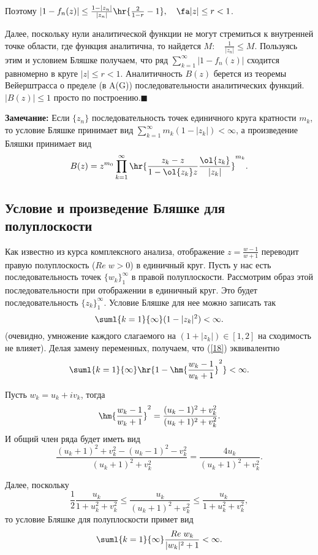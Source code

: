 \documentclass{article}
\begin{document}
Поэтому
$|1-f_n(z)|\le\frac{1-|z_n|}{|z_n|}\hr{\frac2{1-r}-1},\quad\fa
|z|\le r<1$.

Далее, поскольку нули аналитической функции не могут стремиться к внутренней точке области, где функция
аналитична, то найдется $M:\quad \frac1{|z_n|}\le M$. Пользуясь этим и условием Бляшке получаем, что ряд
$\sum_{k=1}^{\infty}|1-f_n(z)|$ сходится равномерно в круге $|z|\le r<1$. Аналитичность $B(z)$ берется из
теоремы Вейерштрасса о пределе (в A(G)) последовательности аналитических функций. $|B(z)|\le1$ просто по
построению.$\blacksquare$

\noindent\textbf{Замечание:} Если $\{z_n\}$ последовательность
точек единичного круга кратности $m_k$, то условие Бляшке
принимает вид $\sum_{k=1}^{\infty} m_k(1-|z_k|)<\infty$, а
произведение Бляшки принимает вид
$$B(z)=z^{m_0}\prod\limits_{k=1}^{\infty}\hr{\frac{z_k-z}{1-\ol{z_k}z}\frac{\ol{z_k}}{|z_k|}}^{m_k}.$$

\subsection{Условие и произведение Бляшке для полуплоскости}
Как известно из курса комплексного анализа, отображение
$z=\frac{w-1}{w+1}$ переводит правую полуплоскость ($Re\;w>0$) в
единичный круг. Пусть у нас есть последовательность точек
$\{w_k\}_1^{\infty}$ в правой полуплоскости. Рассмотрим образ этой
последовательности при отображении в единичный круг. Это будет
последовательность $\{z_k\}_1^{\infty}$. Условие Бляшке для нее
можно записать так
\begin{equation}\label{18}
\suml{k=1}{\infty}(1-|z_k|^2)<\infty.
\end{equation}
(очевидно, умножение каждого слагаемого на $(1+|z_k|)\in[1,2]$ на
сходимость не влияет). Делая замену переменных, получаем, что
(\ref{18}) эквивалентно
\begin{equation}
\suml{k=1}{\infty}\hr{1-\hm{\frac{w_k-1}{w_k+1}}^2}<\infty.
\end{equation}

Пусть $w_k=u_k+iv_k$, тогда
$$\hm{\frac{w_k-1}{w_k+1}}^2=\frac{(u_k-1)^2+v_k^2}{(u_k+1)^2+v_k^2}.$$
И общий член ряда будет иметь вид
$$\frac{(u_k+1)^2+v_k^2-(u_k-1)^2-v_k^2}{(u_k+1)^2+v_k^2}=\frac{4u_k}{(u_k+1)^2+v_k^2}.$$

Далее, поскольку
$$\frac12\frac{u_k}{1+u_k^2+v_k^2}\le\frac{u_k}{(u_k+1)^2+v_k^2}\le\frac{u_k}{1+u_k^2+v_k^2},$$
то условие Бляшке для полуплоскости примет вид
\begin{equation}\label{19}
\suml{k=1}{\infty} \frac{Re\;w_k}{|w_k|^2+1}<\infty.
\end{equation}
\end{document}
